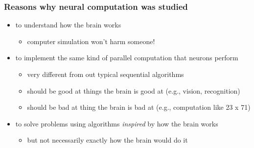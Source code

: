 \documentclass[xcolor=table]{beamer}
\begin{document}
\begin{mdframe}%

\frametitle{Reasons why neural computation was studied}\label{heading-sec-reasons-why-neural-computation-was-studied}%

\begin{itemize}[noitemsep,topsep=\mdcompacttopsep]%

\item{}to understand how the brain works

\begin{itemize}[noitemsep,topsep=\mdcompacttopsep]%

\item{}computer simulation won't harm someone!%
\end{itemize}%

\item{}to implement the same kind of parallel computation that neurons perform

\begin{itemize}[noitemsep,topsep=\mdcompacttopsep]%

\item{}very different from out typical sequential algorithms%

\item{}should be good at things the brain is good at (e.g., vision, recognition)%

\item{}should be bad at thing the brain is bad at (e.g., computation like 23 x 71)%
\end{itemize}%

\item{}to solve problems using algorithms \emph{inspired} by how the brain works

\begin{itemize}[noitemsep,topsep=\mdcompacttopsep]%

\item{}but not necessarily exactly how the brain would do it%
\end{itemize}%
\end{itemize}%
\end{mdframe}\label{sec-reasons-why-neural-computation-was-studied}%
\end{document}
